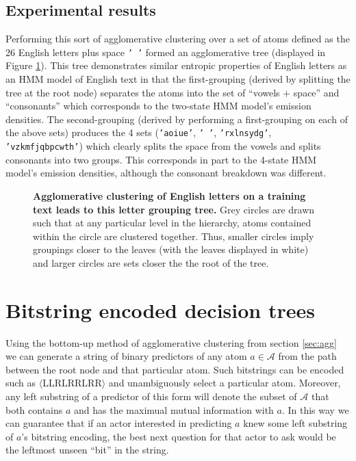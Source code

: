 \documentclass[12pt]{article}
\begin{document}
\subsection{Experimental results}

Performing this sort of agglomerative clustering over a set of atoms
defined as the 26 English letters plus space \texttt{' '} formed an
agglomerative tree (displayed in Figure
\ref{fig:agglomerative-bubbles}). This tree demonstrates similar
entropic properties of English letters as an HMM model of English text
in that the first-grouping (derived by splitting the tree at the root
node) separates the atoms into the set of ``vowels $+$ space'' and
``consonants'' which corresponds to the two-state HMM model's emission
densities. The second-grouping (derived by performing a first-grouping
on each of the above sets) produces the 4 sets (\texttt{'aoiue'},
\texttt{' '}, \texttt{'rxlnsydg'}, \texttt{'vzkmfjqbpcwth'}) which
clearly splits the space from the vowels and splits consonants into
two groups. This corresponds in part to the 4-state HMM model's
emission densities, although the consonant breakdown was different.

\begin{figure}
  \centering
  \caption{\textbf{Agglomerative clustering of English letters on a
      training text leads to this letter grouping tree.} Grey circles
    are drawn such that at any particular level in the hierarchy,
    atoms contained within the circle are clustered together. Thus,
    smaller circles imply groupings closer to the leaves (with the
    leaves displayed in white) and larger circles are sets closer the
    the root of the tree.}
\label{fig:agglomerative-bubbles}
\end{figure}

\section{Bitstring encoded decision trees}

Using the bottom-up method of agglomerative clustering from section
\ref{sec:agg} we can generate a string of binary predictors of any
atom $a \in \mathcal{A}$ from the path between the root node and that
particular atom. Such bitstrings can be encoded such as
$\langle$LLRLRRLRR$\rangle$ and unambiguously select a particular
atom. Moreover, any left substring of a predictor of this form will
denote the subset of $\mathcal{A}$ that both contains $a$ and has the
maximual mutual information with $a$. In this way we can guarantee
that if an actor interested in predicting $a$ knew some left substring
of $a$'s bitstring encoding, the best next question for that actor to
ask would be the leftmost unseen ``bit'' in the string.
\end{document}
